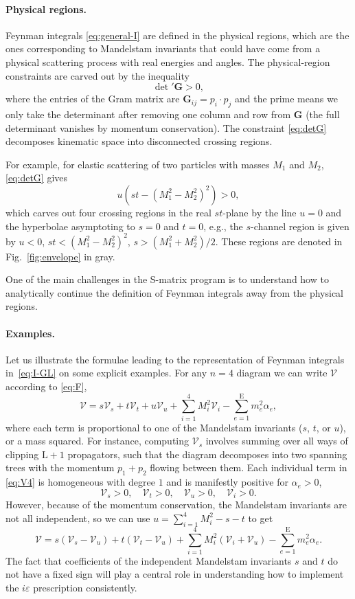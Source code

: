 \documentclass[12pt]{article}
\numberwithin{figure}{section}
\def \be {\begin{equation}}
\def \ee {\end{equation}}
\def \E {\mathrm{E}}
\def \L {\mathrm{L}}
\def \eps {\varepsilon}
\def \V {\mathcal{V}}
\begin{document}
	\paragraph{Physical regions.} Feynman integrals \eqref{eq:general-I} are defined in the physical regions, which are the ones corresponding to Mandelstam invariants that could
	have come from a physical scattering process
	with real energies and angles. The physical-region constraints are carved out by the inequality
	\be\label{eq:detG}
	{\det}' \mathbf{G} > 0,
	\ee
	where the entries of the Gram matrix are $\mathbf{G}_{ij} = p_i \cdot p_j$ and the prime means we only take the determinant after removing one column and row from $\mathbf{G}$ (the full determinant vanishes by momentum conservation). The constraint \eqref{eq:detG} decomposes kinematic space into disconnected crossing regions.
	
	For example, for elastic scattering of two particles with masses $M_1$ and $M_2$,
	\eqref{eq:detG} gives
	\be
	u \left(st - (M_1^2 - M_2^2)^2 \right) > 0,
	\ee
	which carves out four crossing regions in the real $st$-plane by the line $u=0$ and the hyperbolae asymptoting to $s=0$ and $t=0$, e.g., the $s$-channel region is given by $u<0$, $st<(M_1^2 - M_2^2)^2$, $s>(M_1^2 + M_2^2)/2$. These regions are denoted in Fig.~\ref{fig:envelope} in gray.
	
    One of the main challenges in the S-matrix program is to understand how to analytically continue the definition of Feynman integrals away from the physical regions.
	
	\paragraph{Examples.} Let us illustrate the formulae leading to the representation of Feynman integrals in~\eqref{eq:I-GL} on some explicit examples. For any $n=4$ diagram we can write $\V$ according to \eqref{eq:F},
	\be\label{eq:V4}
	\V = s \V_s + t \V_t + u \V_u + \sum_{i=1}^{4} M_i^2 \V_i - \sum_{e=1}^{\E} m_e^2 \alpha_e,
	\ee
	where each term is proportional to one of the Mandelstam invariants ($s$, $t$, or $u$), or a mass squared. For instance, computing $\V_s$ involves summing over all ways of clipping $\L{+}1$ propagators, such that the diagram decomposes into two spanning trees with the momentum $p_1{+}p_2$ flowing between them.
	Each individual term in \eqref{eq:V4} is homogeneous with degree $1$ and is manifestly positive for $\alpha_e > 0$,
	\be
	\V_s > 0, \quad \V_t > 0, \quad \V_u > 0, \quad \V_i > 0.
	\ee
	However, because of the momentum conservation, the Mandelstam invariants are not all independent, so we can use $u = \sum_{i=1}^{4} M_i^2 - s - t$ to get
	\be
	\V = s(\V_s - \V_u) + t(\V_t - \V_u) + \sum_{i=1}^{4} M_i^2 (\V_i + \V_u) - \sum_{e=1}^{\E} m_e^2 \alpha_e.
	\ee
	The fact that coefficients of the independent Mandelstam invariants $s$ and $t$ do not have a fixed sign will play a central role in understanding how to implement the $i\eps$ prescription consistently.
 
\end{document}

